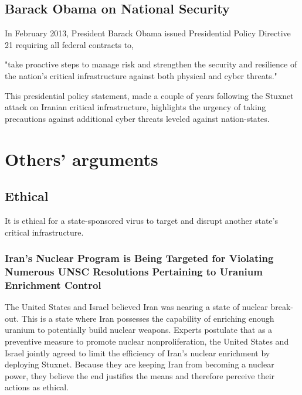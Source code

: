 \documentclass[12pt]{article}
\begin{document}
\begin{multicols}{2}
\subsection{Barack Obama on National Security}

In February 2013, President Barack Obama issued Presidential Policy Directive 21 requiring all federal contracts to,

\begin{blockquote}
"take proactive steps to manage risk and strengthen the security and resilience of the nation's critical infrastructure against both physical and cyber threats."\cite{industrialCyberVulnerabilities}
\end{blockquote}

This presidential policy statement, made a couple of years following the Stuxnet attack on Iranian critical infrastructure, highlights the urgency of taking precautions against additional cyber threats leveled against nation-states.

\section{Others' arguments}

\subsection{Ethical}

It is ethical for a state-sponsored virus to target and disrupt another state's critical infrastructure.

\subsubsection{Iran's Nuclear Program is Being Targeted for Violating Numerous UNSC Resolutions Pertaining to Uranium Enrichment Control}

The United States and Israel believed Iran was nearing a state of nuclear break-out. This is a state where Iran possesses the capability of enriching enough uranium to potentially build nuclear weapons. Experts postulate that as a preventive measure to promote nuclear nonproliferation, the United States and Israel jointly agreed to limit the efficiency of Iran's nuclear enrichment by deploying Stuxnet.\cite{theRealStoryOfStuxnet}  Because they are keeping Iran from becoming a nuclear power, they believe the end justifies the means and therefore perceive their actions as ethical.


\end{multicols}
\end{document}
